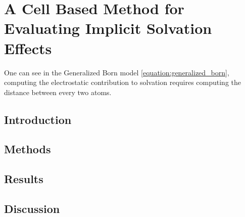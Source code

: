 \chapter[Cell Based Implicit Solvent]{A Cell Based Method for Evaluating Implicit Solvation Effects}
\label{chapter:cell_solvent}

One can see in the Generalized Born model \eqref{equation:generalized_born}, computing the electrostatic contribution to solvation requires computing the distance between every two atoms.

\section{Introduction}
\label{sec:intro}


\section{Methods}
\label{sec:methods}


\section{Results}
\label{sec:results}


\section{Discussion}
\label{sec:discussion}

